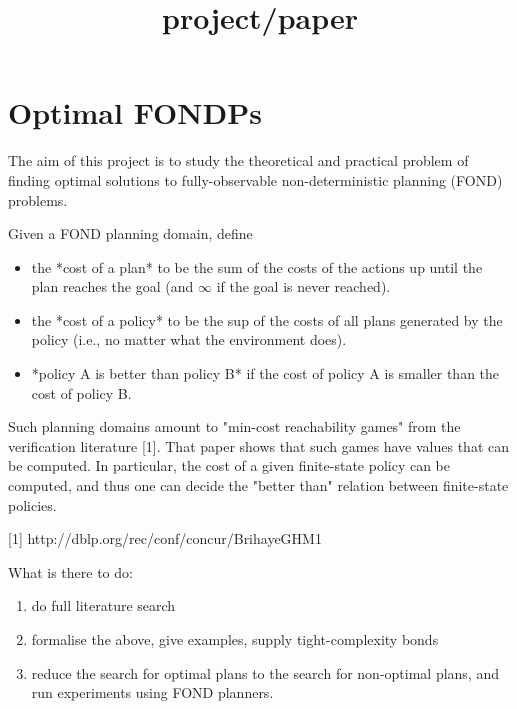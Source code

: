 \documentclass[a4paper,10pt]{article}
\title{project/paper}
\author{}
\date{}
\begin{document}
\maketitle

\section*{Optimal FONDPs}

The aim of this project is to study the theoretical and practical problem 
of finding optimal solutions to fully-observable non-deterministic planning (FOND) problems.

Given a FOND planning domain, define
\begin{itemize}
 \item the *cost of a plan* to be the sum of the costs of the actions up until
 the plan reaches the goal (and $\infty$ if the goal is never reached).
 \item the *cost of a policy* to be the sup of the costs of all plans
  generated by the policy (i.e., no matter what the environment does). 
  \item *policy A is better than policy B* if the cost of policy A is
  smaller than the cost of policy B.
\end{itemize}

Such planning domains amount to "min-cost reachability games" from the
verification literature [1]. That paper shows that such games have
values that can be computed. In particular, the cost of a given
finite-state policy can be computed, and thus one can decide the
"better than" relation between finite-state policies.

[1] http://dblp.org/rec/conf/concur/BrihayeGHM1


What is there to do:
\begin{enumerate}
 \item do full literature search
 \item formalise the above, give examples, supply tight-complexity bonds
 \item reduce the search for optimal plans to the search for non-optimal plans, and run experiments using FOND planners.
\end{enumerate}

% 
% 
\end{document}
